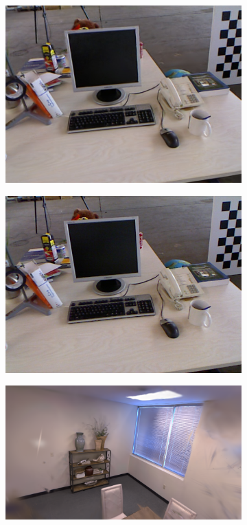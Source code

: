 \begin{figure}[ht]
\begin{subfigure}[ht]{0.24\linewidth}
        \includegraphics[width=1\linewidth]{fig/fig_mono/tum/fr2_/HQ-SLAM/30000_1.jpg}
    \end{subfigure}
    \begin{subfigure}[ht]{0.24\linewidth}
        \includegraphics[width=1\linewidth]{fig/fig_mono/tum/fr2_/gt/30000_1.jpg}
    \end{subfigure}
    \begin{subfigure}[ht]{0.24\linewidth}
        \includegraphics[width=1\linewidth]{fig/fig_mono/replica/room2_/MonoGS/00752.png}

\end{subfigure}
\end{figure}
